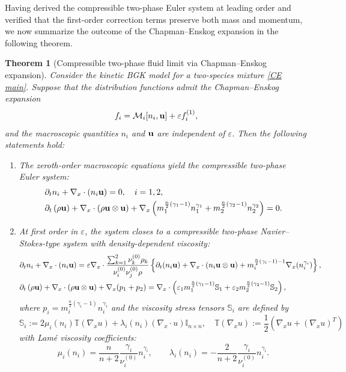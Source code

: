 \documentclass[10pt,reqno]{amsart}
\numberwithin{equation}{section}
\newtheorem{theorem}{Theorem}[section]
\begin{document}
Having derived the compressible two-phase Euler system at leading order and verified that the first-order correction terms preserve both mass and momentum, we now summarize the outcome of the Chapman--Enskog expansion in the following theorem.


 \begin{theorem}[Compressible two-phase fluid limit via Chapman--Enskog expansion]\label{thm:formal}
Consider the kinetic BGK model for a two-species mixture \eqref{CE main}. Suppose that the distribution functions admit the Chapman--Enskog expansion
\[
f_i = \mathcal{M}_i[n_i, {\bf{u}}] + \varepsilon f_i^{(1)},
\]
and the macroscopic quantities $n_i$ and ${\bf{u}}$ are independent of $\varepsilon$. Then the following statements hold:
\begin{enumerate}
    \item[(i)] The zeroth-order macroscopic equations yield the compressible two-phase Euler system:
    \begin{align*}
    &\partial_t n_i + \nabla_x \cdot (n_i {\bf{u}}) = 0, \quad i=1,2, \\
    &\partial_t \left( \rho  {\bf{u}} \right) + \nabla_x \cdot \left( \rho {\bf{u}} \otimes {\bf{u}} \right) + \nabla_x \left( m_1^{\frac{n}{2}(\gamma_1 - 1)} n_1^{\gamma_1} + m_2^{\frac{n}{2}(\gamma_2 - 1)} n_2^{\gamma_2} \right) = 0.
    \end{align*}

    \item[(ii)] At first order in $\varepsilon$, the system closes to a compressible two-phase Navier--Stokes-type system with density-dependent viscosity:
\begin{align*}
    &\partial_t n_i + \nabla_x \cdot (n_i {\bf{u}}) = \varepsilon \nabla_x \cdot \frac{\sum_{k=1}^2\nu_k^{(0)}\rho_k}{\nu_{i}^{(0)}\nu_{j}^{(0)}\rho }\left\{ \partial_t (n_i {\bf{u}}) + \nabla_x \cdot (n_i {\bf{u}} \otimes {\bf{u}}) +m_i^{\frac n2(\gamma_i - 1)-1} \nabla_x (n_i^{\gamma_i}) \right\},  \\
    &\partial_t \left( \rho  {\bf{u}} \right) + \nabla_x \cdot \left( \rho  {\bf{u}} \otimes {\bf{u}} \right) + \nabla_x (p_1 + p_2)   = \nabla_x \cdot \left( \varepsilon_1 m_1^{\frac{n}{2}(\gamma_1 - 1)} \mathbb{S}_1 + \varepsilon_2 m_2^{\frac{n}{2}(\gamma_2 - 1)} \mathbb{S}_2 \right),
    \end{align*}
    where $p_i = m_i^{\frac{n}{2}(\gamma_i - 1)} n_i^{\gamma_i}$ and the viscosity stress tensors $\mathbb{S}_i$ are defined by
    \[
    \mathbb{S}_i := 2 \mu_i(n_i) \mathbb{T}(\nabla_x u) + \lambda_i(n_i) (\nabla_x \cdot u) \mathbb{I}_{n \times n}, \quad
    \mathbb{T}(\nabla_x u) := \frac{1}{2}(\nabla_x u + (\nabla_x u)^T)
    \]
    with Lam\'e viscosity coefficients:
    \[
    \mu_i(n_i) = \frac{n }{n+2}\frac{\gamma_i}{\nu_i^{(0)}} n_i^{\gamma_i}, \qquad
    \lambda_i(n_i) = -\frac{2 }{n+2} \frac{\gamma_i}{\nu_i^{(0)}}n_i^{\gamma_i}.
    \]


\end{enumerate}
\end{theorem}
\end{document}
